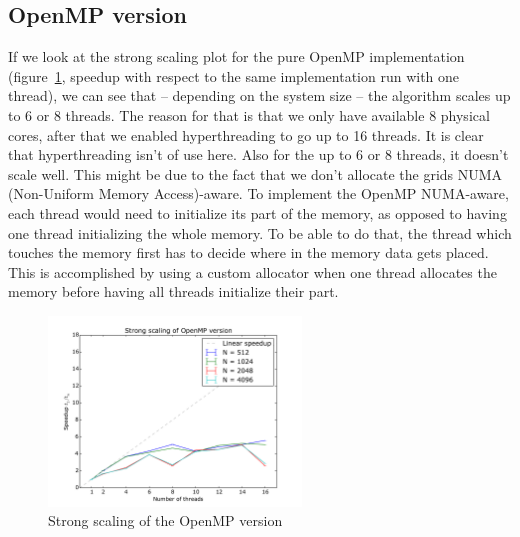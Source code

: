 \documentclass[a4paper]{article}
\begin{document}
\subsection{OpenMP version}

If we look at the strong scaling plot for the pure OpenMP implementation (figure~\ref{fig:omp-strong-scaling}, speedup with respect to the same implementation run with one thread), we can see that -- depending on the system size -- the algorithm scales up to 6 or 8 threads.
The reason for that is that we only have available 8 physical cores, after that we enabled hyperthreading to go up to 16 threads.
It is clear that hyperthreading isn't of use here.
Also for the up to 6 or 8 threads, it doesn't scale well.
This might be due to the fact that we don't allocate the grids NUMA (Non-Uniform Memory Access)-aware.
To implement the OpenMP NUMA-aware, each thread would need to initialize its part of the memory, as opposed to having one thread initializing the whole memory.
To be able to do that, the thread which touches the memory first has to decide where in the memory data gets placed.
This is accomplished by using a custom allocator when one thread allocates the memory before having all threads initialize their part.
\begin{figure}
	\centering
	\includegraphics[width=0.6\textwidth]{omp_strong_scaling.pdf}
	\caption{Strong scaling of the OpenMP version}
	\label{fig:omp-strong-scaling}
\end{figure}

\end{document}

